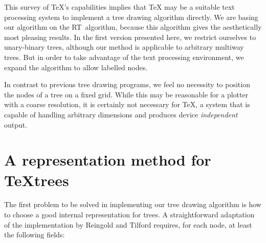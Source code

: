 This survey of \TeX's capabilities implies that \TeX{} may be a suitable        
text processing system to implement a tree drawing algorithm directly.          
We are basing our algorithm on the RT~algorithm, because this algorithm               
gives the aesthetically most pleasing results. In the first version
presented here, we         
restrict ourselves to unary-binary trees, although our method is                
applicable to arbitrary multiway trees. But in order to take advantage          
of the text processing environment, we expand the algorithm to allow            
labelled nodes.                                                                 
                                                                                
In contrast to previous tree drawing programs, we feel no necessity to          
position the nodes of a tree on a fixed grid. While this may be                 
reasonable for a plotter with a coarse resolution, it is certainly not          
necessary for \TeX, a system that is capable of handling                        
arbitrary dimensions                                                            
and produces device \emph{independent} output.                            

                                                                                
\section{A representation method for \TeX{}trees}                               
                                                                                
The first problem to be solved in implementing our tree drawing algorithm       
is how to choose a good internal representation                                 
for trees. A straightforward adaptation                                         
of the implementation by Reingold and Tilford requires, for each node,          
at least the following fields:                                                  
                                                                                
